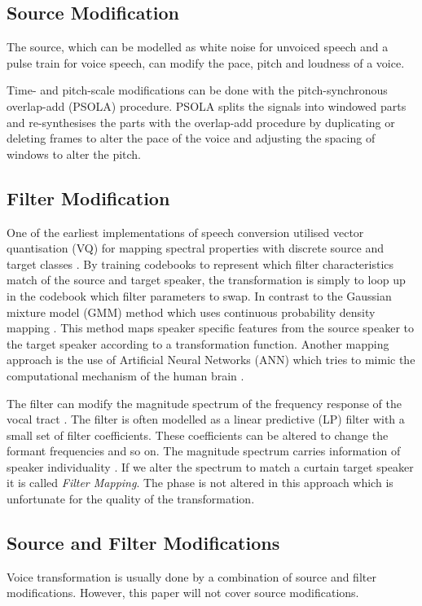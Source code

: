 \subsection{Source Modification} %
\label{sub:source_modification}
The source, which can be modelled as white noise for unvoiced speech and a pulse train for voice speech, can modify the pace, pitch and loudness of a voice. 

Time- and pitch-scale modifications can be done with the pitch-synchronous overlap-add (PSOLA) procedure. PSOLA splits the signals into windowed parts and re-synthesises the parts with the overlap-add procedure by duplicating or deleting frames to alter the pace of the voice and adjusting the spacing of windows to alter the pitch.

\subsection{Filter Modification} %
\label{sub:filter_modification}
One of the earliest implementations of speech conversion utilised vector quantisation (VQ) for mapping spectral properties with discrete source and target classes \cite{abe88}. By training codebooks to represent which filter characteristics match of the source and target speaker, the transformation is simply to loop up in the codebook which filter parameters to swap. In contrast to the Gaussian mixture model (GMM) method which uses continuous probability density mapping \cite{stylianou98}. This method maps speaker specific features from the source speaker to the target speaker according to a transformation function. Another mapping approach is the use of Artificial Neural Networks (ANN) \cite{desai09} which tries to mimic the computational mechanism of the human brain \cite{young75}.

The filter can modify the magnitude spectrum of the frequency response of the vocal tract \cite{nguyen09}. The filter is often modelled as a linear predictive (LP) filter with a small set of filter coefficients. These coefficients can be altered to change the formant frequencies and so on. The magnitude spectrum carries information of speaker individuality \cite{stylianou09}. If we alter the spectrum to match a curtain target speaker it is called \emph{Filter Mapping}. The phase is not altered in this approach which is unfortunate for the quality of the transformation.   

\subsection{Source and Filter Modifications} %
\label{sub:source_and_filter_modifications}
Voice transformation is usually done by a combination of source and filter modifications. However, this paper will not cover source modifications.

